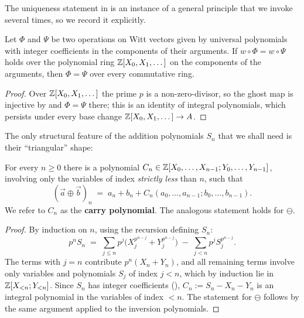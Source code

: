 The uniqueness statement in  is an instance of a
general principle that we invoke several times, so we record it explicitly.

\begin{lemma}\label{lemma:ghost_principle:reorg}
Let $\Phi$ and $\Psi$ be two operations on Witt vectors given by universal polynomials
with integer coefficients in the components of their arguments. If
$w \circ \Phi = w \circ \Psi$ holds over the polynomial ring
$\mathbb{Z}[X_0, X_1, \dots]$ on the components of the arguments, then $\Phi = \Psi$ over
every commutative ring.
\end{lemma}

\begin{proof}
Over $\mathbb{Z}[X_0, X_1, \dots]$ the prime $p$ is a non-zero-divisor, so the ghost map is
injective by  and $\Phi = \Psi$ there; this is an
identity of integral polynomials, which persists under every base change
$\mathbb{Z}[X_0, X_1, \dots] \to A$.
\end{proof}

The only structural feature of the addition polynomials $S_n$ that we shall need is
their ``triangular'' shape:

\begin{prop}\label{prop:witt_addition_shape:reorg}
For every $n \geq 0$ there is a polynomial
$C_n \in \mathbb{Z}[X_0, \dots, X_{n-1}; Y_0, \dots, Y_{n-1}]$, involving only the variables of
index \emph{strictly less} than $n$, such that
\begin{equation}\label{eq:witt_addition_shape:reorg}
(\vec a \oplus \vec b)_n \;=\; a_n + b_n + C_n(a_0, \dots, a_{n-1}; b_0, \dots, b_{n-1}).
\end{equation}
We refer to $C_n$ as the \textbf{carry polynomial}. The analogous statement holds for
$\ominus$.
\end{prop}

\begin{proof}
By induction on $n$, using the recursion defining $S_n$:
\[
p^n S_n \;=\; \sum_{j \leq n} p^j \bigl(X_j^{p^{n-j}} + Y_j^{p^{n-j}}\bigr)
\;-\; \sum_{j < n} p^j S_j^{p^{n-j}} .
\]
The terms with $j = n$ contribute $p^n (X_n + Y_n)$, and all remaining terms involve
only variables and polynomials $S_j$ of index $j < n$, which by induction lie in
$\mathbb{Z}[X_{<n}; Y_{<n}]$. Since $S_n$ has integer coefficients
(), $C_n := S_n - X_n - Y_n$ is an integral
polynomial in the variables of index $< n$. The statement for $\ominus$ follows by the
same argument applied to the inversion polynomials.
\end{proof}


